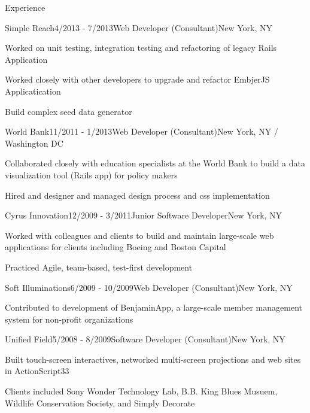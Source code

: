 \documentclass{resume} %
\begin{document}
\begin{rSection}{Experience}
\clearpage

\begin{rSubsection}{Simple Reach}{4/2013 - 7/2013}{Web Developer (Consultant)}{New York, NY}
\item Worked on unit testing, integration testing and refactoring of legacy Rails Application
\item Worked closely with other developers to upgrade and refactor EmbjerJS Applicatication
\item Build complex seed data generator
\end{rSubsection}

\begin{rSubsection}{World Bank}{11/2011 - 1/2013}{Web Developer (Consultant)}{New York, NY / Washington DC}
\item Collaborated closely with education specialists at the World Bank to build a data visualization tool (Rails app) for policy makers
\item Hired and designer and managed design process and css implementation
\end{rSubsection}

\begin{rSubsection}{Cyrus Innovation}{12/2009 - 3/2011}{Junior Software Developer}{New York, NY}
\item Worked with colleagues and clients to build and maintain large-scale web applications for clients including Boeing and Boston Capital
\item Practiced Agile, team-based, test-first development
\end{rSubsection}

\begin{rSubsection}{Soft Illuminations}{6/2009 - 10/2009}{Web Developer (Consultant)}{New York, NY}
\item Contributed to development of BenjaminApp, a large-scale member management system for non-profit organizations
\end{rSubsection}

\begin{rSubsection}{Unified Field}{5/2008 - 8/2009}{Software Developer (Consultant)}{New York, NY}
\item Built touch-screen interactives, networked multi-screen projections and web sites in ActionScript33
\item Clients included Sony Wonder Technology Lab, B.B. King Blues Musuem, Wildlife Conservation Society, and Simply Decorate
\end{rSubsection}


\end{rSection}
\end{document}
